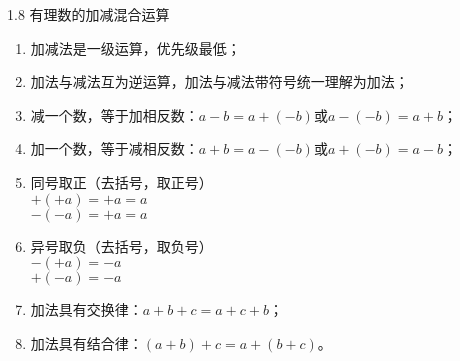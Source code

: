 \documentclass[aspectratio=169]{ctexbeamer} %
\date{\today}
\begin{document}
\begin{frame}[t]{1.8 有理数的加减混合运算}
\begin{spacing}{1.5}
\large
\begin{enumerate}[label={\arabic*.}]
\item 加减法是一级运算，优先级最低；
\item 加法与减法互为逆运算，加法与减法带符号统一理解为加法；
\item 减一个数，等于加相反数：$a - b = a + (-b)$或$a - (-b) = a + b$；
\item 加一个数，等于减相反数：$a + b = a -(-b)$或$a + (-b) = a - b$；
\item 同号取正（去括号，取正号） \\
$+(+a) = +a = a$ \\
$-(-a) = +a = a$ 
\item 异号取负（去括号，取负号）\\
$-(+a) = -a$ \\
$+(-a) = -a$ \\
\item 加法具有交换律：$a + b + c = a + c + b$；
\item 加法具有结合律：$(a + b) + c = a + (b + c)$。
\end{enumerate}

\end{spacing}
\end{frame}
\end{document}
